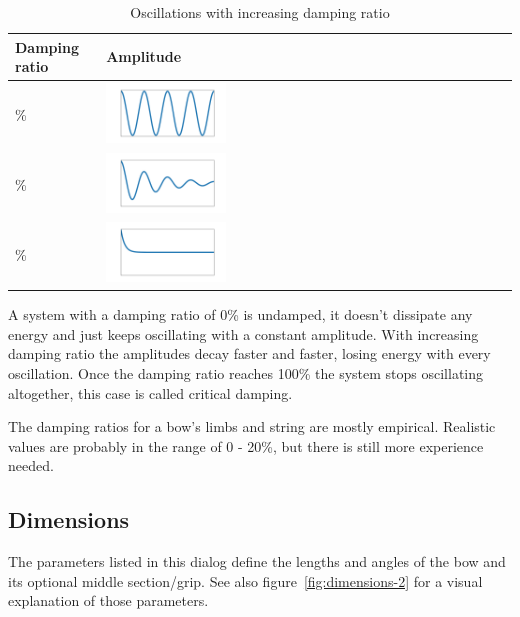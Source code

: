 \documentclass[12pt]{article}
\begin{document}
\begin{table}[H]
\centering
\begin{tabular}{| m{4cm} | m{4.6cm} |}
\hline
\textbf{Damping ratio} & \textbf{Amplitude} \\ \hline
\center 0\% & \includegraphics[width=0.3\textwidth]{figures/damping-ratio-00} \\ \hline
\center 10\% & \includegraphics[width=0.3\textwidth]{figures/damping-ratio-01} \\ \hline
\center 100\% & \includegraphics[width=0.3\textwidth]{figures/damping-ratio-10} \\ \hline
\end{tabular}
\caption{Oscillations with increasing damping ratio}
\label{tbl:damping-ratio}
\end{table}

A system with a damping ratio of 0\% is undamped, it doesn't dissipate any energy and just keeps oscillating with a constant amplitude.
With increasing damping ratio the amplitudes decay faster and faster, losing energy with every oscillation.
Once the damping ratio reaches 100\% the system stops oscillating altogether, this case is called critical damping.

The damping ratios for a bow's limbs and string are mostly empirical.
Realistic values are probably in the range of 0 - 20\%, but there is still more experience needed.

\newpage
\subsection{Dimensions}

The parameters listed in this dialog define the lengths and angles of the bow and its optional middle section/grip. See also figure~\ref{fig:dimensions-2} for a visual explanation of those parameters.
\end{document}
